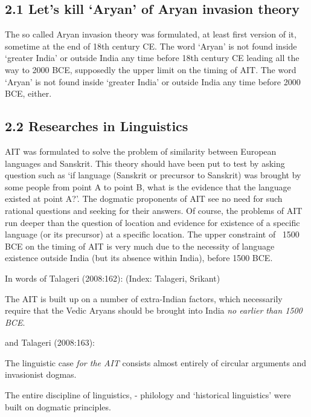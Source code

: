 \subsection*{2.1 Let’s kill ‘Aryan’ of Aryan invasion theory}

The so called Aryan invasion theory was formulated, at least first version of it, sometime at the end of 18th century CE. The word ‘Aryan’ is not found inside ‘greater India’ or outside India any time before 18th century CE leading all the way to 2000 BCE, supposedly the upper limit on the timing of AIT. The word ‘Aryan’ is not found inside ‘greater India’ or outside India any time before 2000 BCE, either.


\subsection*{2.2 Researches in Linguistics}

AIT was formulated to solve the problem of similarity between European languages and Sanskrit. This theory should have been put to test by asking question such as ‘if language (Sanskrit or precursor to Sanskrit) was brought by some people from point A to point B, what is the evidence that the language existed at point A?’. The dogmatic proponents of AIT see no need for such rational questions and seeking for their answers. Of course, the problems of AIT run deeper than the question of location and evidence for existence of a specific language (or its precursor) at a specific location. The upper constraint of ~1500 BCE on the timing of AIT is very much due to the necessity of language existence outside India (but its absence within India), before 1500 BCE.

In words of Talageri (2008:162): (Index: Talageri, Srikant)

\begin{myquote}
The AIT is built up on a number of extra-Indian factors, which necessarily require that the Vedic Aryans should be brought into India \textit{no earlier than 1500 BCE}.
\end{myquote}

and Talageri (2008:163):

\begin{myquote}
The linguistic case \textit{for the AIT} consists almost entirely of circular arguments and invasionist dogmas.
\end{myquote}

The entire discipline of linguistics, - philology and ‘historical linguistics’ were built on dogmatic principles.

